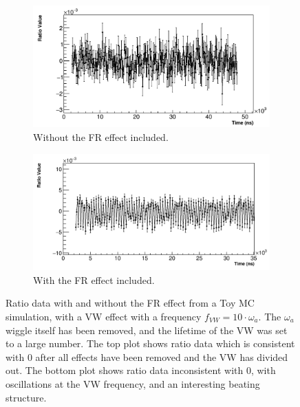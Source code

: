 \documentclass[12pt,letterpaper]{article}
\def\wa{$\omega_{a}$\xspace}
\begin{document}
\begin{figure}[]
\centering
    \begin{subfigure}[t]{0.6\textwidth}
        \centering
        \includegraphics[width=\textwidth]{JamesMC_noFR}
        \caption{Without the FR effect included.}
    \end{subfigure}%

    \begin{subfigure}[t]{0.6\textwidth}
        \centering
        \includegraphics[width=\textwidth]{JamesMC_withFR}
        \caption{With the FR effect included.}
    \end{subfigure}
\caption[]{Ratio data with and without the FR effect from a Toy MC simulation, with a VW effect with a frequency $f_{VW} = 10 \cdot \omega_{a}$. The \wa wiggle itself has been removed, and the lifetime of the VW was set to a large number. The top plot shows ratio data which is consistent with 0 after all effects have been removed and the VW has divided out. The bottom plot shows ratio data inconsistent with 0, with oscillations at the VW frequency, and an interesting beating structure.}
\label{fig:JamesMC_VW_FR}
\end{figure}
\end{document}
